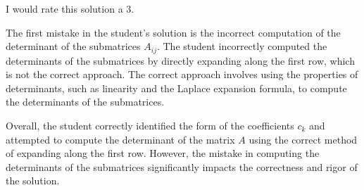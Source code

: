 I would rate this solution a 3. 

The first mistake in the student's solution is the incorrect computation of the determinant of the submatrices $A_{ij}$. The student incorrectly computed the determinants of the submatrices by directly expanding along the first row, which is not the correct approach. The correct approach involves using the properties of determinants, such as linearity and the Laplace expansion formula, to compute the determinants of the submatrices. 

Overall, the student correctly identified the form of the coefficients $c_k$ and attempted to compute the determinant of the matrix $A$ using the correct method of expanding along the first row. However, the mistake in computing the determinants of the submatrices significantly impacts the correctness and rigor of the solution.
